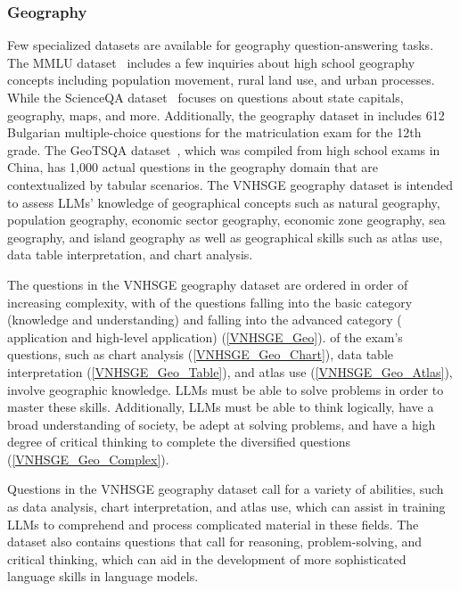 \documentclass{article}
\begin{document}
{	\subsubsection{Geography}
	
	Few specialized datasets are available for geography question-answering tasks. The MMLU dataset~\cite{hendrycks2020measuring} includes a few inquiries about high school geography concepts including population movement, rural land use, and urban processes. While the ScienceQA dataset~\cite{lu2022learn} focuses on questions about state capitals, geography, maps, and more. Additionally, the geography dataset in \cite{hardalov2019beyond} includes 612 Bulgarian multiple-choice questions for the matriculation exam for the 12th grade. The GeoTSQA dataset~\cite{li2021tsqa}, which was compiled from high school exams in China, has 1,000 actual questions in the geography domain that are contextualized by tabular scenarios. The VNHSGE geography dataset is intended to assess LLMs' knowledge of geographical concepts such as natural geography, population geography, economic sector geography, economic zone geography, sea geography, and island geography as well as geographical skills such as atlas use, data table interpretation, and chart analysis.
	
	The questions in the VNHSGE geography dataset are ordered in order of increasing complexity, with   of the questions falling into the basic category (knowledge and understanding) and   falling into the advanced category ( application and   high-level application) (\ref{VNHSGE_Geo}).   of the exam's questions, such as chart analysis (\ref{VNHSGE_Geo_Chart}), data table interpretation (\ref{VNHSGE_Geo_Table}), and atlas use (\ref{VNHSGE_Geo_Atlas}), involve geographic knowledge. LLMs must be able to solve problems in order to master these skills. Additionally, LLMs must be able to think logically, have a broad understanding of society, be adept at solving problems, and have a high degree of critical thinking to complete the diversified questions (\ref{VNHSGE_Geo_Complex}). 
	
	Questions in the VNHSGE geography dataset call for a variety of abilities, such as data analysis, chart interpretation, and atlas use, which can assist in training LLMs to comprehend and process complicated material in these fields. The dataset also contains questions that call for reasoning, problem-solving, and critical thinking, which can aid in the development of more sophisticated language skills in language models.
	
}
\end{document}
